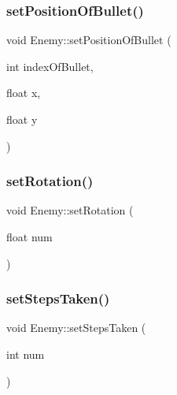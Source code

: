 \mbox{\label{class_enemy_a49e2b8533dc258764e7a0ee5c4990eeb}} 
\subsubsection{\texorpdfstring{set\+Position\+Of\+Bullet()}{setPositionOfBullet()}}
{\footnotesize\ttfamily void Enemy\+::set\+Position\+Of\+Bullet (\begin{DoxyParamCaption}\item[{int}]{index\+Of\+Bullet,  }\item[{float}]{x,  }\item[{float}]{y }\end{DoxyParamCaption})\hspace{0.3cm}{\ttfamily [inline]}}

\mbox{\label{class_enemy_ad02b7dfac0339e110f9aba837a815782}} 
\subsubsection{\texorpdfstring{set\+Rotation()}{setRotation()}}
{\footnotesize\ttfamily void Enemy\+::set\+Rotation (\begin{DoxyParamCaption}\item[{float}]{num }\end{DoxyParamCaption})\hspace{0.3cm}{\ttfamily [inline]}}

\mbox{\label{class_enemy_a8ddda321d45a2fa6f35272087afe258b}} 
\subsubsection{\texorpdfstring{set\+Steps\+Taken()}{setStepsTaken()}}
{\footnotesize\ttfamily void Enemy\+::set\+Steps\+Taken (\begin{DoxyParamCaption}\item[{int}]{num }\end{DoxyParamCaption})\hspace{0.3cm}{\ttfamily [inline]}}

